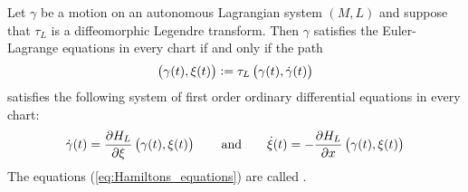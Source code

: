 \begin{theorem}
	\label{thm:Hamiltons_equations}
	Let $\gamma$ be a motion on an autonomous Lagrangian system $(M,L)$ and suppose that $\tau_L$ is a diffeomorphic Legendre transform. Then $\gamma$ satisfies the Euler-Lagrange equations in every chart if and only if the path 
	\begin{equation*}
			\del[1]{\gamma(t),\xi(t)} := \tau_L\del[1]{\gamma(t),\dot{\gamma}(t)}
	\end{equation*}
	\noindent satisfies the following system of first order ordinary differential equations in every chart:
	\begin{equation}
		\label{eq:Hamiltons_equations}
		\dot{\gamma}(t) = \frac{\partial H_L}{\partial \xi}\del[1]{\gamma(t),\xi(t)} \qquad \text{and} \qquad \dot{\xi}(t) = -\frac{\partial H_L}{\partial x}\del[1]{\gamma(t),\xi(t)}
	\end{equation}
	The equations \textup{(}\ref{eq:Hamiltons_equations}\textup{)} are called .
\end{theorem}

